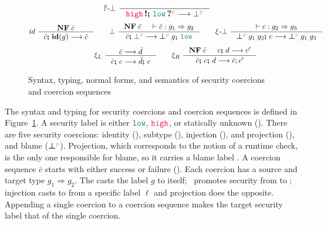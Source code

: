 \begin{figure}[tbp]
{\begin{gather*}
  \quad
  \textit{?-}\bot~
  \inference{}
            {\inj{\high} \seq \proj{\low}{p} \longrightarrow \bot^{\bl{p}}}
  \end{gather*}}
  {\small
  \begin{gather*}
  \textit{id}~
  \inference{\mathbf{NF}\; \bar{c}}
            {\bar{c} \seq \id{g} \longrightarrow \bar{c}}
  \qquad
  \bot~
  \inference{\mathbf{NF}\; \bar{c} & \vdash \bar{c} : g_1 \Rightarrow g_2}
            {\bar{c} \seq \bot^{\bl{p}} \longrightarrow \err{g_1}{\low}{p} }
  \qquad
  \xi\textit{-}\bot~
  \inference{\vdash c : g_2 \Rightarrow g_3}
    {\err{g_1}{g_2}{p} \seq c \longrightarrow \err{g_1}{g_3}{p}}
  \\[1ex]
  \xi_L~
  \inference{\bar{c} \longrightarrow \bar{d}}{\bar{c} \seq c \longrightarrow \bar{d} \seq c}
  \qquad
  \xi_R~
  \inference{\mathbf{NF}\; \bar{c} & c \seq d \longrightarrow c'}
            {\bar{c} \seq c \seq d \longrightarrow \bar{c}; c'}
  \end{gather*}}
  \caption{Syntax, typing, normal forms, and semantics of security coercions and coercion sequences}
  \label{fig:cexpr}
\end{figure}

The syntax and typing for security coercions and coercion sequences is defined
in Figure~\ref{fig:cexpr}. A security label is either $\low$, $\high$, or
statically unknown (\unk). There are five security coercions: identity (),
subtype (\up), injection (\inj{\ell}), and projection (), and
blame ($\boldsymbol{\bot}^{\bl{p}}$). Projection, which corresponds to the
notion of a runtime check, is the only one responsible for blame, so it carries
a blame label . A coercion sequence $\bar{c}$ starts with either success
 or failure (). Each coercion has a source and target
type $g_1 \Rightarrow g_2$. The  casts the label $g$ to itself;
\up~promotes security from \low to \high; injection casts to \unk from a
specific label $\ell$ and projection does the opposite. Appending a single
coercion to a coercion sequence makes the target security label that of the
single coercion.

